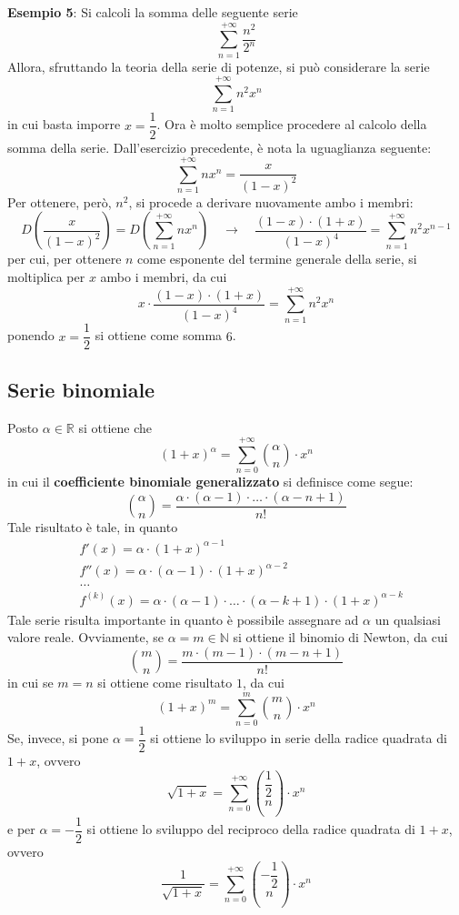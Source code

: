\documentclass[a4paper]{extarticle}
\begin{document}
\vspace{2em}
\noindent
\textbf{Esempio 5}: Si calcoli la somma delle seguente serie
\[\sum_{n=1}^{+\infty} \frac{n^2}{2^n}\]
Allora, sfruttando la teoria della serie di potenze, si può considerare la serie
\[\sum_{n=1}^{+\infty} n^2 x^n\]
in cui basta imporre $x=\dfrac{1}{2}$. Ora è molto semplice procedere al calcolo della somma della serie. Dall'esercizio precedente, è nota la uguaglianza seguente:
\[\sum_{n=1}^{+\infty} n x^n = \frac{x}{(1-x)^2}\]
Per ottenere, però, $n^2$, si procede a derivare nuovamente ambo i membri:
\[D \left(\frac{x}{(1-x)^2}\right) = D \left(\sum_{n=1}^{+\infty} n x^n \right) \hspace{1em} \rightarrow \hspace{1em} \dfrac{(1-x) \cdot (1+x)}{(1-x)^4} = \sum_{n=1}^{+\infty} n^2 x^{n-1}\]
per cui, per ottenere $n$ come esponente del termine generale della serie, si moltiplica per $x$ ambo i membri, da cui
\[x \cdot \dfrac{(1-x) \cdot (1+x)}{(1-x)^4} = \sum_{n=1}^{+\infty} n^2 x^n\]
ponendo $x=\dfrac{1}{2}$ si ottiene come somma $6$.

\newpage
\noindent
\subsection{Serie binomiale}
Posto $\alpha \in \mathbb{R}$ si ottiene che
\[(1+x)^\alpha = \sum_{n=0}^{+\infty} \binom{\alpha}{n} \cdot x^n\]
in cui il \textbf{coefficiente binomiale generalizzato} si definisce come segue:
\[\binom{\alpha}{n} = \frac{\alpha \cdot (\alpha-1) \cdot \dots \cdot (\alpha-n+1)}{n!}\]
Tale risultato è tale, in quanto
\begin{align*}
    & f'(x) = \alpha \cdot (1+x)^{\alpha-1}\\
    & f''(x) = \alpha \cdot (\alpha-1) \cdot (1+x)^{\alpha-2}\\
    & \dots\\
    & f^{(k)}(x) = \alpha \cdot (\alpha - 1) \cdot \dots \cdot (\alpha - k + 1) \cdot (1+x)^{\alpha-k}
\end{align*}
Tale serie risulta importante in quanto è possibile assegnare ad $\alpha$ un qualsiasi valore reale. Ovviamente, se $\alpha = m \in \mathbb{N}$ si ottiene il binomio di Newton, da cui
\[\binom{m}{n} = \frac{m \cdot (m-1) \cdot (m-n+1)}{n!}\]
in cui se $m=n$ si ottiene come risultato $1$, da cui
\[(1+x)^m = \sum_{n=0}^m \binom{m}{n} \cdot x^n\]
Se, invece, si pone $\alpha=\dfrac{1}{2}$ si ottiene lo sviluppo in serie della radice quadrata di $1+x$, ovvero
\[\sqrt{1+x}=\sum_{n=0}^{+\infty} \binom{\dfrac{1}{2}}{n} \cdot x^n\]
e per $\alpha=-\dfrac{1}{2}$ si ottiene lo sviluppo del reciproco della radice quadrata di $1+x$, ovvero
\[\frac{1}{\sqrt{1+x}} = \sum_{n=0}^{+\infty} \binom{-\dfrac{1}{2}}{n} \cdot x^n\]
\end{document}

